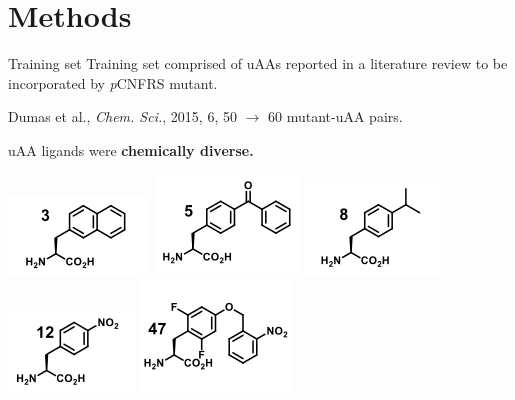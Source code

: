 \documentclass{beamer}
\begin{document}
\section{Methods}
\begin{frame}{Training set}
    Training set comprised of uAAs reported in a literature review to be incorporated by \textit{p}CNFRS mutant.
    
    Dumas et al., \textit{Chem. Sci.}, 2015, 6, 50 $\rightarrow$ 60 mutant-uAA pairs.
    
    uAA ligands were \textbf{chemically diverse.}
    
    \includegraphics[scale = 0.4]{uAA3.png}
    \includegraphics[scale = 0.4]{uAA5.png}
    \includegraphics[scale = 0.4]{uAA8.png}
    \includegraphics[scale = 0.4]{uAA12.png}
    \includegraphics[scale = 0.4]{uAA47.png}
\end{frame}
\end{document}
